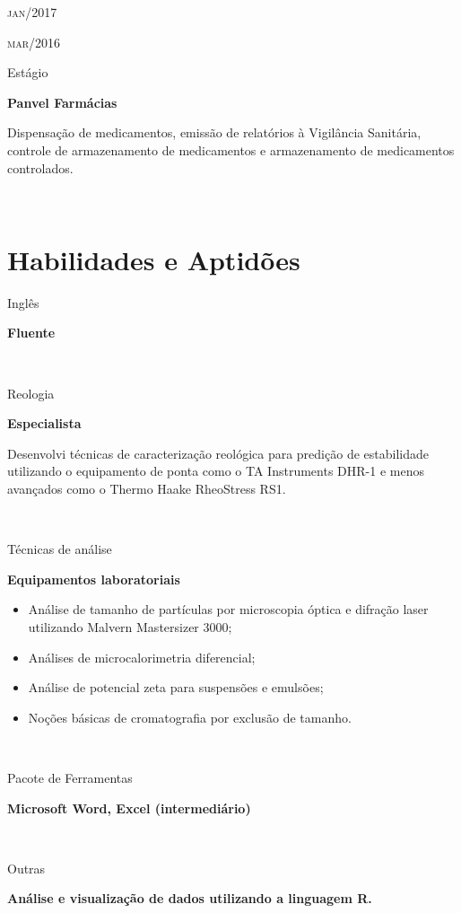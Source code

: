 \documentclass[a4paper, 11pt]{article}
\newcommand{\entry}[5]{
	\begin{minipage}[t]{.1\textwidth}
		\begin{flushright}
			\hfill
			{\textsc{#1}}

			{\textsc{#2}}
		\end{flushright}
	\end{minipage}
	\hfill\textcolor{Sepia}{\vline}\hfill
	\begin{minipage}[t]{.825\textwidth}

		#3
		
		\textcolor{Sepia}{\textbf{#4}}
		
		\footnotesize{#5}

	\end{minipage} \\ 
	\vspace{.5cm}

}
\begin{document}
\entry{jan/2017}{mar/2016}
{Estágio}
{Panvel Farmácias}
{Dispensação de medicamentos, 
emissão de relatórios à Vigilância Sanitária, 
controle de armazenamento de medicamentos e 
armazenamento de medicamentos controlados.}



\section{Habilidades e Aptidões}

\entry{}{}{Inglês}{Fluente}{}

\entry{}{}{Reologia}{Especialista}{Desenvolvi técnicas de caracterização reológica para predição de estabilidade utilizando o equipamento de ponta como o TA Instruments DHR-1 e menos avançados como o Thermo Haake RheoStress RS1.}

\renewcommand{\labelitemi}{\textendash}

\entry{}{}{Técnicas de análise}{Equipamentos laboratoriais}{
	\begin{itemize}
	\item Análise de tamanho de partículas por microscopia óptica e difração laser utilizando Malvern Mastersizer 3000;
	\item Análises de microcalorimetria diferencial;
	\item Análise de potencial zeta para suspensões e emulsões;
	\item Noções básicas de cromatografia por exclusão de tamanho.
	\end{itemize}}

\entry{}{}{Pacote de Ferramentas}{Microsoft Word, Excel (intermediário)}{}

\entry{}{}{Outras}{Análise e visualização de dados utilizando a linguagem R.}{}
\end{document}
